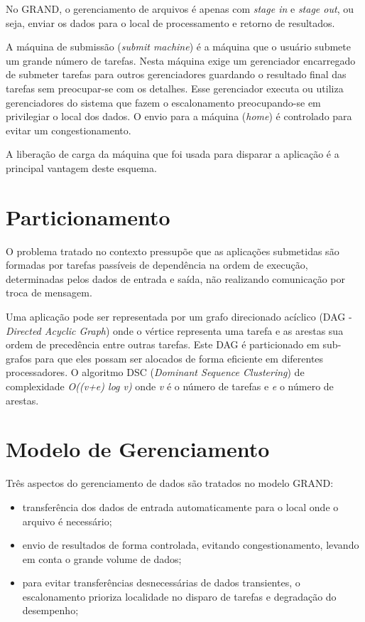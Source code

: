 No GRAND, o gerenciamento de arquivos é apenas com \emph{stage in} e \emph{stage out}, ou seja, enviar os dados para o local de processamento e retorno de resultados. 

A máquina de submissão (\emph{submit machine}) é a máquina que o usuário submete um grande número de tarefas. Nesta máquina exige um gerenciador encarregado de submeter tarefas para outros gerenciadores guardando o resultado final das tarefas sem preocupar-se com os detalhes. Esse gerenciador executa ou utiliza gerenciadores do sistema que fazem o escalonamento preocupando-se em privilegiar o local dos dados. O envio para a máquina (\emph{home}) é controlado para evitar um congestionamento.

A liberação de carga da máquina que foi usada para disparar a aplicação é a principal vantagem deste esquema.


\section{Particionamento}

O problema tratado no contexto pressupõe que as aplicações submetidas são formadas por tarefas passíveis de dependência na ordem de execução, determinadas pelos dados de entrada e saída, não realizando comunicação por troca de mensagem.

Uma aplicação pode ser representada por um grafo direcionado acíclico (DAG - \emph{Directed Acyclic Graph}) onde o vértice representa uma tarefa e as arestas sua ordem de precedência entre outras tarefas. Este DAG é particionado em sub-grafos para que eles possam ser alocados de forma eficiente em diferentes processadores. O algoritmo DSC (\emph{Dominant Sequence Clustering}) de complexidade \emph{O((v+e) log v)} onde \emph{v} é o número de tarefas e \emph{e} o número de arestas.

\section{Modelo de Gerenciamento}

Três aspectos do gerenciamento de dados são tratados no modelo GRAND:

\begin{itemize}
	\item transferência dos dados de entrada automaticamente para o local onde o arquivo é necessário;
	\item envio de resultados de forma controlada, evitando congestionamento, levando em conta o grande volume de dados;
	\item para evitar transferências desnecessárias de dados transientes, o escalonamento prioriza localidade no disparo de tarefas e degradação do desempenho;
\end{itemize}

